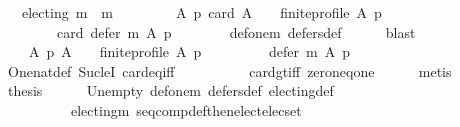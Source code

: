 \begin{isabellebody}
\ \ \ {\isachardoublequoteopen}electing\ {\isacharparenleft}{\kern0pt}m{}\ {\isasymtriangleright}\ m{}{\isacharparenright}{\kern0pt}{\isachardoublequoteclose}\isanewline
%
\isadelimproof
%
\endisadelimproof
%
\isatagproof
{}\isamarkupfalse%
\ {\isacharminus}{\kern0pt}\isanewline
\ \ \isamarkupfalse%
\isanewline
\ \ \ \ {\isachardoublequoteopen}{\isasymforall}A\ p{\isachardot}{\kern0pt}\ {\isacharparenleft}{\kern0pt}card\ A\ {\isasymge}\ {}\ {\isasymand}\ finite{\isacharunderscore}{\kern0pt}profile\ A\ p{\isacharparenright}{\kern0pt}\ {\isasymlongrightarrow}\isanewline
\ \ \ \ \ \ \ \ card\ {\isacharparenleft}{\kern0pt}defer\ m{}\ A\ p{\isacharparenright}{\kern0pt}\ {\isacharequal}{\kern0pt}\ {}{\isachardoublequoteclose}\isanewline
\ \ \ \ \isamarkupfalse%
\ def{\isacharunderscore}{\kern0pt}one{\isacharunderscore}{\kern0pt}m{}\ defers{\isacharunderscore}{\kern0pt}def\isanewline
\ \ \ \ \isamarkupfalse%
\ blast\isanewline
\ \ \isamarkupfalse%
\isanewline
\ \ \ \ {\isachardoublequoteopen}{\isasymforall}A\ p{\isachardot}{\kern0pt}\ {\isacharparenleft}{\kern0pt}A\ {\isasymnoteq}\ {\isacharbraceleft}{\kern0pt}{\isacharbraceright}{\kern0pt}\ {\isasymand}\ finite{\isacharunderscore}{\kern0pt}profile\ A\ p{\isacharparenright}{\kern0pt}\ {\isasymlongrightarrow}\isanewline
\ \ \ \ \ \ \ \ defer\ m{}\ A\ p\ {\isasymnoteq}\ {\isacharbraceleft}{\kern0pt}{\isacharbraceright}{\kern0pt}{\isachardoublequoteclose}\isanewline
\ \ \ \ \isamarkupfalse%
\ One{\isacharunderscore}{\kern0pt}nat{\isacharunderscore}{\kern0pt}def\ Suc{\isacharunderscore}{\kern0pt}leI\ card{\isacharunderscore}{\kern0pt}eq{\isacharunderscore}{\kern0pt}{}{\isacharunderscore}{\kern0pt}iff\isanewline
\ \ \ \ \ \ \ \ \ \ card{\isacharunderscore}{\kern0pt}gt{\isacharunderscore}{\kern0pt}{}{\isacharunderscore}{\kern0pt}iff\ zero{\isacharunderscore}{\kern0pt}neq{\isacharunderscore}{\kern0pt}one\isanewline
\ \ \ \ \isamarkupfalse%
\ metis\isanewline
\ \ \isamarkupfalse%
\ {\isacharquery}{\kern0pt}thesis\isanewline
\ \ \ \ \isamarkupfalse%
\ Un{\isacharunderscore}{\kern0pt}empty\ def{\isacharunderscore}{\kern0pt}one{\isacharunderscore}{\kern0pt}m{}\ defers{\isacharunderscore}{\kern0pt}def\ electing{\isacharunderscore}{\kern0pt}def\isanewline
\ \ \ \ \ \ \ \ \ \ electing{\isacharunderscore}{\kern0pt}m{}\ seq{\isacharunderscore}{\kern0pt}comp{\isacharunderscore}{\kern0pt}def{\isacharunderscore}{\kern0pt}then{\isacharunderscore}{\kern0pt}elect{\isacharunderscore}{\kern0pt}elec{\isacharunderscore}{\kern0pt}set\isanewline

\end{isabellebody}
